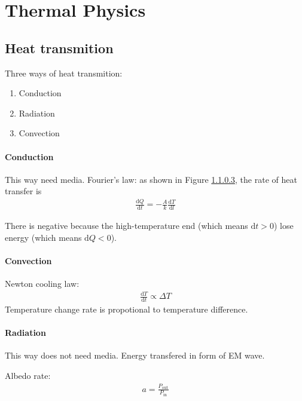 

\section{Thermal Physics}
    \subsection{Heat transmition}
        Three ways of heat transmition:
        \begin{enumerate}
            \item Conduction
            \item Radiation
            \item Convection
        \end{enumerate}

        \paragraph{Conduction}
            This way need media.
            Fourier's law: as shown in Figure \ref{}, the rate of heat transfer is
            \begin{align}
                \frac{\mathrm{d} Q}{\mathrm{d} t} = -\frac{A}{k} \frac{\mathrm{d} T}{\mathrm{d} l}
            \end{align}

            There is negative because the high-temperature end (which means $\mathrm{d} t > 0$) lose energy (which means $\mathrm{d} Q < 0$).
        
        \paragraph{Convection}
            Newton cooling law: 
            \begin{align}
                \frac{\mathrm{d} T}{\mathrm{d} t} \propto \Delta T
            \end{align}
            Temperature change rate is propotional to temperature difference.

        \paragraph{Radiation}
            This way does not need media. Energy transfered in form of EM wave.

            Albedo rate:
            \begin{align}
                a = \frac{P_{\mathrm{out}}}{P_{\mathrm{in}}}
            \end{align}


